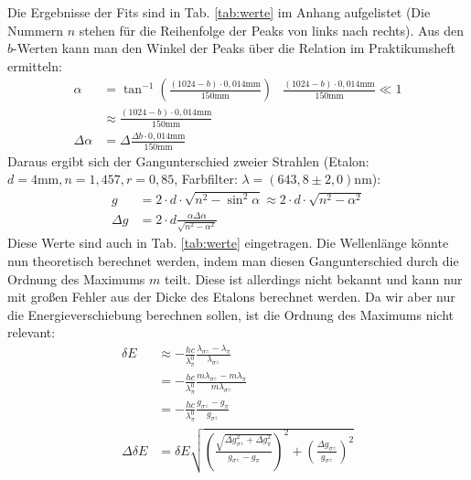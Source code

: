 Die Ergebnisse der Fits sind in Tab. \ref{tab:werte} im Anhang aufgelistet (Die Nummern $n$ stehen für die Reihenfolge der Peaks von links nach rechts). Aus den $b$-Werten kann man den Winkel der Peaks über die Relation im Praktikumsheft ermitteln:
\begin{align*}
\alpha &= \tan^{-1}\left(\frac{(1024-b)\cdot 0,014\si{\milli\meter}}{150\si{\milli\meter}}\right) & \frac{(1024-b)\cdot 0,014\si{\milli\meter}}{150\si{\milli\meter}} \ll 1\\
&\approx \frac{(1024-b)\cdot 0,014\si{\milli\meter}}{150\si{\milli\meter}}\\
\Delta \alpha &= \Delta \frac{\Delta b\cdot 0,014\si{\milli\meter}}{150\si{\milli\meter}}
\end{align*}   
Daraus ergibt sich der Gangunterschied zweier Strahlen (Etalon: $d = 4\si{\milli\meter}, n = 1,457, r = 0,85$, Farbfilter: $\lambda = (643,8\pm 2,0) \si{\nano\meter}$):
\begin{align*}
g &= 2\cdot d \cdot \sqrt{n^2 - \sin^2{\alpha}} \approx 2\cdot d \cdot \sqrt{n^2 - \alpha^2}\\
\Delta g &= 2\cdot d \frac{\alpha \Delta\alpha}{\sqrt{n^2 - \alpha^2}}
\end{align*}
Diese Werte sind auch in Tab. \ref{tab:werte} eingetragen. Die Wellenlänge könnte nun theoretisch berechnet werden, indem man diesen Gangunterschied durch die Ordnung des Maximums $m$ teilt. Diese ist allerdings nicht bekannt und kann nur mit großen Fehler aus der Dicke des Etalons berechnet werden. Da wir aber nur die Energieverschiebung berechnen sollen, ist die Ordnung des Maximums nicht relevant:
\begin{align*}
\delta E &\approx -\frac{hc}{\lambda_\pi^0} \frac{\lambda_{\sigma^\pm} - \lambda_\pi}{\lambda_{\sigma^\pm}}\\
	&= -\frac{hc}{\lambda_\pi^0} \frac{m \lambda_{\sigma^\pm} - m \lambda_\pi}{m\lambda_{\sigma^\pm}}\\
	& = -\frac{hc}{\lambda_\pi^0} \frac{g_{\sigma^\pm} - g_\pi}{g_{\sigma^\pm}}\\
\Delta \delta E &= \delta E \sqrt{\left(\frac{\sqrt{\Delta g_{\sigma^\pm}^2 + \Delta g_\pi^2}}{g_{\sigma^\pm} - g_\pi}\right)^2 + \left(\frac{\Delta g_{\sigma^\pm}}{g_{\sigma^\pm}}\right)^2}
\end{align*}

